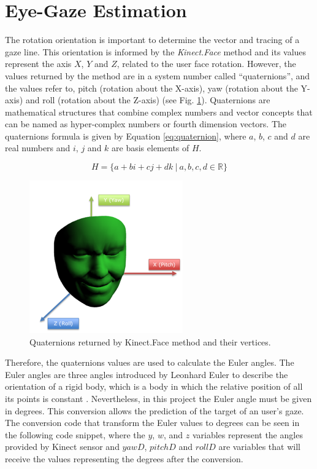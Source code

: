 \documentclass[10pt, conference]{IEEEtran}
\begin{document}
\section{Eye-Gaze Estimation} \label{sec:eyeGazeEstimation}

	The rotation orientation is important to determine the vector and tracing of a gaze line. 
	This orientation is informed by the \emph{Kinect.Face} method and its values represent the axis $X$, $Y$ and $Z$, related to the user face rotation. 
	However, the values returned by the method are in a system number called ``quaternions'', and the values refer to, pitch (rotation about the X-axis), yaw (rotation about the Y-axis) and roll (rotation about the Z-axis) (see Fig. \ref{fig:fig4}). 
	Quaternions are mathematical structures that combine complex numbers and vector concepts \cite{2,11} that can be named as hyper-complex numbers or fourth dimension vectors. 
	The quaternions formula is given by Equation \ref{eq:quaternion}, where $a$, $b$, $c$ and $d$ are real numbers and $i$, $j$ and $k$ are basis elements of $H$.
    
    \begin{equation}
		H = \{a+ bi + cj + dk ~ \vert ~ a, b, c, d \in \mathbb{R} \}
        \label{eq:quaternion}
	\end{equation}

\begin{figure}[t]
	\centering
	\includegraphics{figures/pic4.png}
    \caption{Quaternions returned by Kinect.Face method and their vertices.}
    \label{fig:fig4}
\end{figure}

	Therefore, the quaternions values are used to calculate the Euler angles. 
	The Euler angles are three angles introduced by Leonhard Euler to describe the orientation of a rigid body, which is a body in which the relative position of all its points is constant \cite{12}. 
	Nevertheless, in this project the Euler angle must be given in degrees.
    This conversion allows the prediction of the target of an user's gaze.
	The conversion code that transform the Euler values to degrees can be seen in the following code snippet, where the $y$, $w$, and $z$ variables represent the angles provided by Kinect sensor and $yawD$, $pitchD$ and $rollD$ are variables that will receive the values representing the degrees after the conversion.
    
\end{document}
